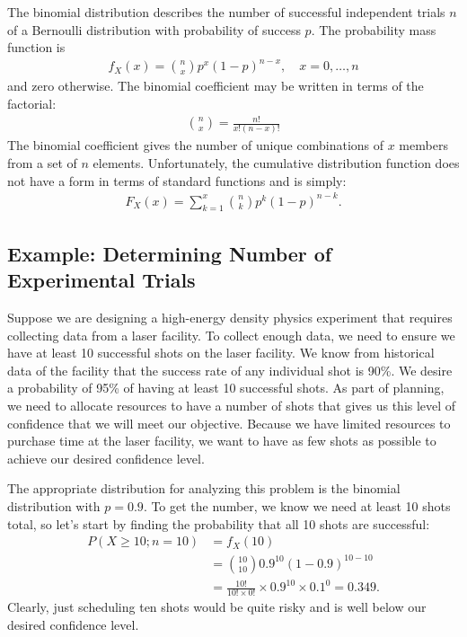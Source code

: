 The binomial distribution describes the number of successful independent trials $n$ of a Bernoulli distribution with probability of success $p$. The probability mass function is
\begin{align}
  f_X(x) = \binom{n}{x} p^x ( 1 - p )^{n-x} , \quad x = 0, \ldots, n 
\end{align}
and zero otherwise. The binomial coefficient may be written in terms of the factorial:
\begin{align}
  \binom{n}{x} = \frac{ n! }{ x! ( n - x )! } 
\end{align}
The binomial coefficient gives the number of unique combinations of $x$ members from a set of $n$ elements. Unfortunately, the cumulative distribution function does not have a form in terms of standard functions and is simply:
\begin{align}
  F_X(x) = \sum_{k=1}^x \binom{n}{k} p^k ( 1 - p )^{n-k} .
\end{align}


\subsection{Example: Determining Number of Experimental Trials}

Suppose we are designing a high-energy density physics experiment that requires collecting data from a laser facility. To collect enough data, we need to ensure we have at least 10 successful shots on the laser facility. We know from historical data of the facility that the success rate of any individual shot is 90\%. We desire a probability of 95\% of having at least 10 successful shots. As part of planning, we need to allocate resources to have a number of shots that gives us this level of confidence that we will meet our objective. Because we have limited resources to purchase time at the laser facility, we want to have as few shots as possible to achieve our desired confidence level.

The appropriate distribution for analyzing this problem is the binomial distribution with $p = 0.9$. To get the number, we know we need at least 10 shots total, so let's start by finding the probability that all 10 shots are successful:
\begin{align}
  P(X \ge 10 ; n = 10) &= f_X(10) \nonumber \\
  &= \binom{10}{10} 0.9^{10} ( 1 - 0.9 )^{10-10} \nonumber \\
  &= \frac{ 10! }{ 10! \times 0! } \times 0.9^{10} \times 0.1^0 = 0.349 . \nonumber
\end{align}
Clearly, just scheduling ten shots would be quite risky and is well below our desired confidence level.


